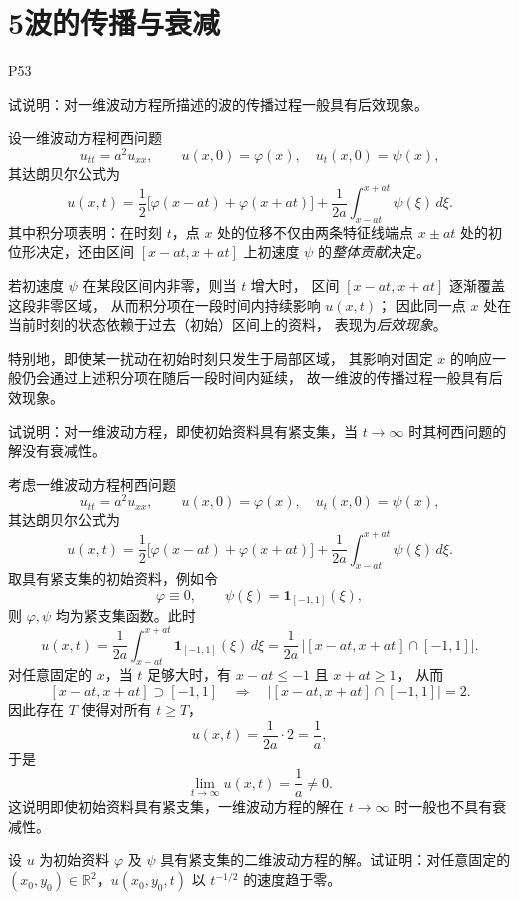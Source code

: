 \section{5波的传播与衰减}
P53
\begin{homework}[1]
试说明：对一维波动方程所描述的波的传播过程一般具有后效现象。
\end{homework}
\begin{solution}
设一维波动方程柯西问题
\[
u_{tt}=a^{2}u_{xx},\qquad u(x,0)=\varphi(x),\quad u_t(x,0)=\psi(x),
\]
其达朗贝尔公式为
\[
u(x,t)=\frac12\bigl[\varphi(x-at)+\varphi(x+at)\bigr]
+\frac{1}{2a}\int_{x-at}^{x+at}\psi(\xi)\,d\xi.
\]
其中积分项表明：在时刻 $t$，点 $x$ 处的位移不仅由两条特征线端点
$x\pm at$ 处的初位形决定，还由区间 $[x-at,x+at]$ 上初速度
$\psi$ 的\emph{整体贡献}决定。

若初速度 $\psi$ 在某段区间内非零，则当 $t$ 增大时，
区间 $[x-at,x+at]$ 逐渐覆盖这段非零区域，
从而积分项在一段时间内持续影响 $u(x,t)$；
因此同一点 $x$ 处在当前时刻的状态依赖于过去（初始）区间上的资料，
表现为\emph{后效现象}。

特别地，即使某一扰动在初始时刻只发生于局部区域，
其影响对固定 $x$ 的响应一般仍会通过上述积分项在随后一段时间内延续，
故一维波的传播过程一般具有后效现象。
\end{solution}
\begin{homework}[2]
试说明：对一维波动方程，即使初始资料具有紧支集，当 $t\to\infty$ 时其柯西问题的解没有衰减性。
\end{homework}
\begin{solution}
考虑一维波动方程柯西问题
\[
u_{tt}=a^{2}u_{xx},\qquad u(x,0)=\varphi(x),\quad u_t(x,0)=\psi(x),
\]
其达朗贝尔公式为
\[
u(x,t)=\frac12\bigl[\varphi(x-at)+\varphi(x+at)\bigr]
+\frac{1}{2a}\int_{x-at}^{x+at}\psi(\xi)\,d\xi.
\]
取具有紧支集的初始资料，例如令
\[
\varphi\equiv 0,\qquad \psi(\xi)=\mathbf 1_{[-1,1]}(\xi),
\]
则 $\varphi,\psi$ 均为紧支集函数。此时
\[
u(x,t)=\frac{1}{2a}\int_{x-at}^{x+at}\mathbf 1_{[-1,1]}(\xi)\,d\xi
=\frac{1}{2a}\, \bigl|[x-at,x+at]\cap[-1,1]\bigr|.
\]
对任意固定的 $x$，当 $t$ 足够大时，有 $x-at\le -1$ 且 $x+at\ge 1$，
从而
\[
[x-at,x+at]\supset[-1,1]\quad\Rightarrow\quad
\bigl|[x-at,x+at]\cap[-1,1]\bigr|=2.
\]
因此存在 $T$ 使得对所有 $t\ge T$，
\[
u(x,t)=\frac{1}{2a}\cdot 2=\frac{1}{a},
\]
于是
\[
\lim_{t\to\infty}u(x,t)=\frac{1}{a}\neq 0.
\]
这说明即使初始资料具有紧支集，一维波动方程的解在 $t\to\infty$ 时一般也不具有衰减性。
\end{solution}
\begin{homework}[3]
设 $u$ 为初始资料 $\varphi$ 及 $\psi$ 具有紧支集的二维波动方程的解。试证明：对任意固定的 $(x_0,y_0)\in\mathbb{R}^2$，$u(x_0,y_0,t)$ 以 $t^{-1/2}$ 的速度趋于零。
\end{homework}
